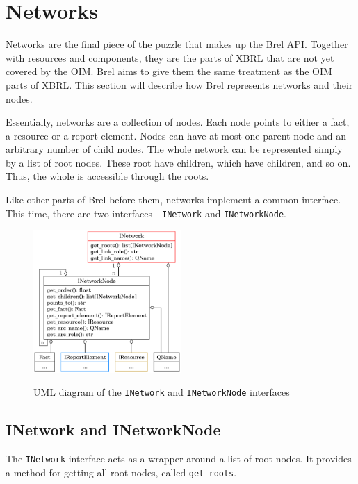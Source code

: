 \section{Networks}
\label{sec:api_networks}

Networks are the final piece of the puzzle that makes up the Brel API.
Together with resources and components, they are the parts of XBRL that are not yet covered by the OIM.
Brel aims to give them the same treatment as the OIM parts of XBRL.
This section will describe how Brel represents networks and their nodes.

Essentially, networks are a collection of nodes.
Each node points to either a fact, a resource or a report element.
Nodes can have at most one parent node and an arbitrary number of child nodes.
The whole network can be represented simply by a list of root nodes.
These root have children, which have children, and so on.
Thus, the whole is accessible through the roots.

Like other parts of Brel before them, networks implement a common interface.
This time, there are two interfaces - \texttt{INetwork} and \texttt{INetworkNode}.

\begin{figure}[H]
    \centering
    \caption{UML diagram of the \texttt{INetwork} and \texttt{INetworkNode} interfaces}
    \includegraphics[width=0.5\textwidth]{images/brel_network_interfaces.png}
    \label{fig:brel_network_interfaces}
\end{figure}

\subsection{INetwork and INetworkNode}

The \texttt{INetwork} interface acts as a wrapper around a list of root nodes.
It provides a method for getting all root nodes, called \texttt{get\_roots}.

